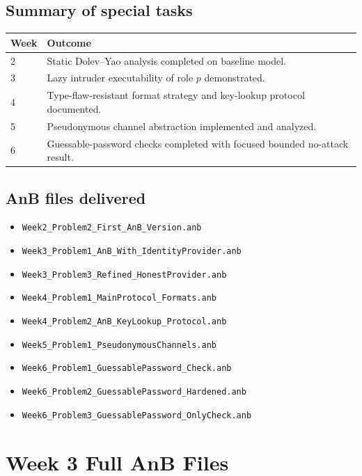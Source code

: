 \documentclass[11pt,a4paper]{article}
\begin{document}
\subsection{Summary of special tasks}
\begin{center}
\begin{tabular}{ll}
\toprule
\textbf{Week} & \textbf{Outcome} \\
\midrule
2 & Static Dolev--Yao analysis completed on baseline model. \\
3 & Lazy intruder executability of role $p$ demonstrated. \\
4 & Type-flaw-resistant format strategy and key-lookup protocol documented. \\
5 & Pseudonymous channel abstraction implemented and analyzed. \\
6 & Guessable-password checks completed with focused bounded no-attack result. \\
\bottomrule
\end{tabular}
\end{center}

\subsection{AnB files delivered}
\begin{itemize}[leftmargin=1.2em]
  \item \texttt{Week2\_Problem2\_First\_AnB\_Version.anb}
  \item \texttt{Week3\_Problem1\_AnB\_With\_IdentityProvider.anb}
  \item \texttt{Week3\_Problem3\_Refined\_HonestProvider.anb}
  \item \texttt{Week4\_Problem1\_MainProtocol\_Formats.anb}
  \item \texttt{Week4\_Problem2\_AnB\_KeyLookup\_Protocol.anb}
  \item \texttt{Week5\_Problem1\_PseudonymousChannels.anb}
  \item \texttt{Week6\_Problem1\_GuessablePassword\_Check.anb}
  \item \texttt{Week6\_Problem2\_GuessablePassword\_Hardened.anb}
  \item \texttt{Week6\_Problem3\_GuessablePassword\_OnlyCheck.anb}
\end{itemize}

\appendix
\section{Week 3 Full AnB Files}
\end{document}
